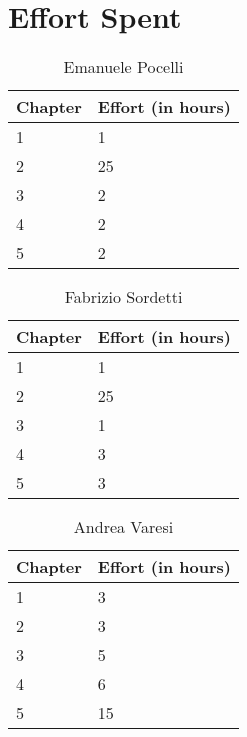 \section{Effort Spent}


\begin{table}[h]
  \centering
  \caption*{Emanuele Pocelli}
  \begin{tabularx}{\textwidth}{|X|X|}
    \hline
    \textbf{Chapter} & \textbf{Effort (in hours)}\\
    \hline
    1 & 1\\
    \hline
    2 & 25\\ 
    \hline
    3 & 2\\
    \hline 
    4 & 2\\ 
    \hline
    5 & 2\\
    \hline
  \end{tabularx}
\end{table}

\begin{table}[h]
  \centering
  \caption*{Fabrizio Sordetti}
  \begin{tabularx}{\textwidth}{|X|X|}
    \hline
    \textbf{Chapter} & \textbf{Effort (in hours)}\\
    \hline
    1 & 1\\
    \hline
    2 & 25\\
    \hline
    3 & 1\\
    \hline 
    4 & 3\\
    \hline
    5 & 3\\
    \hline
  \end{tabularx}
\end{table}

\begin{table}[h]
  \centering
  \caption*{Andrea Varesi}
  \begin{tabularx}{\textwidth}{|X|X|}
    \hline
    \textbf{Chapter} & \textbf{Effort (in hours)}\\
    \hline
    1 & 3\\
    \hline
    2 & 3\\
    \hline
    3 & 5\\
    \hline 
    4 & 6\\
    \hline
    5 & 15\\
    \hline
  \end{tabularx}
\end{table}

